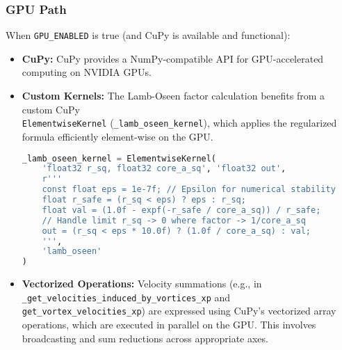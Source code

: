 \documentclass[12pt,letterpaper]{article}
\begin{document}
\subsubsection{GPU Path}
When \texttt{GPU\_ENABLED} is true (and CuPy is available and functional):
\begin{itemize}
    \item \textbf{CuPy:} CuPy provides a NumPy-compatible API for GPU-accelerated computing on NVIDIA GPUs.
    \item \textbf{Custom Kernels:} The Lamb-Oseen factor calculation benefits from a custom CuPy \\ \texttt{ElementwiseKernel} (\texttt{\_lamb\_oseen\_kernel}), which applies the regularized formula efficiently element-wise on the GPU.
    \begin{lstlisting}[language=Python, caption=CuPy ElementwiseKernel for Lamb-Oseen factor (simplified)., basicstyle=\footnotesize\ttfamily, label={lst:cupy_kernel}]
_lamb_oseen_kernel = ElementwiseKernel(
    'float32 r_sq, float32 core_a_sq', 'float32 out',
    r'''
    const float eps = 1e-7f; // Epsilon for numerical stability
    float r_safe = (r_sq < eps) ? eps : r_sq;
    float val = (1.0f - expf(-r_safe / core_a_sq)) / r_safe;
    // Handle limit r_sq -> 0 where factor -> 1/core_a_sq
    out = (r_sq < eps * 10.0f) ? (1.0f / core_a_sq) : val; 
    ''',
    'lamb_oseen'
)
    \end{lstlisting}
    \item \textbf{Vectorized Operations:} Velocity summations (e.g., in \\ \texttt{\_get\_velocities\_induced\_by\_vortices\_xp} and \texttt{get\_vortex\_velocities\_xp}) are expressed using CuPy's vectorized array operations, which are executed in parallel on the GPU. This involves broadcasting and sum reductions across appropriate axes.
\end{itemize}
\end{document}
